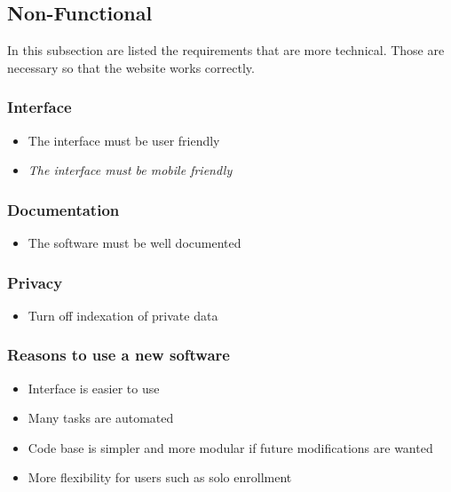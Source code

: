 \documentclass[a4paper, 12pt]{article}
\begin{document}
\subsection*{Non-Functional}
In this subsection are listed the requirements that are more technical. Those are necessary so that the website works correctly. 

\subsubsection*{Interface}
	
	\begin{itemize}
		\item The interface must be user friendly
		\item \textit{The interface must be mobile friendly}
	\end{itemize}

\subsubsection*{Documentation}
	
	\begin{itemize}
		\item The software must be well documented
	\end{itemize}
	
\subsubsection*{Privacy}
    
    \begin{itemize}
    	\item Turn off indexation of private data
    \end{itemize}



\subsubsection*{Reasons to use a new software}


	\begin{itemize}
		\item Interface is easier to use
		\item Many tasks are automated
		\item Code base is simpler and more modular if future modifications are wanted
		\item More flexibility for users such as solo enrollment
	\end{itemize}
\end{document}
